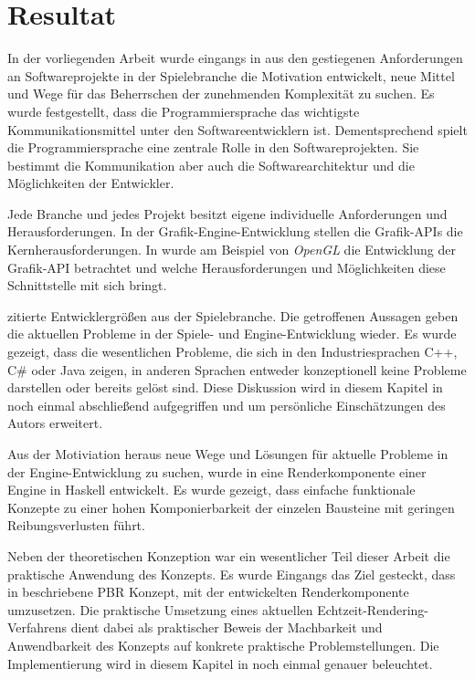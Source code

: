 \chapter{Resultat}
\label{chap:resultat}

In der vorliegenden Arbeit wurde eingangs in  aus den gestiegenen Anforderungen an Softwareprojekte in der Spielebranche die Motivation entwickelt, neue Mittel und Wege für das Beherrschen der zunehmenden Komplexität zu suchen. Es wurde festgestellt, dass die Programmiersprache das wichtigste Kommunikationsmittel unter den Softwareentwicklern ist. Dementsprechend spielt die Programmiersprache eine zentrale Rolle in den Softwareprojekten. Sie bestimmt die Kommunikation aber auch die Softwarearchitektur und die Möglichkeiten der Entwickler.

Jede Branche und jedes Projekt besitzt eigene individuelle Anforderungen und Herausforderungen. In der Grafik-Engine-Entwicklung stellen die Grafik-\ac{API}s die Kernherausforderungen. In  wurde am Beispiel von \textit{OpenGL} die Entwicklung der Grafik-\ac{API} betrachtet und welche Herausforderungen und Möglichkeiten diese Schnittstelle mit sich bringt.

 zitierte Entwicklergrößen aus der Spielebranche. Die getroffenen Aussagen geben die aktuellen Probleme in der Spiele- und Engine-Entwicklung wieder. Es wurde gezeigt, dass die wesentlichen Probleme, die sich in den Industriesprachen C++, C\# oder Java zeigen, in anderen Sprachen entweder konzeptionell keine Probleme darstellen oder bereits gelöst sind. Diese Diskussion wird in diesem Kapitel in  noch einmal abschließend aufgegriffen und um persönliche Einschätzungen des Autors erweitert.

Aus der Motiviation heraus neue Wege und Lösungen für aktuelle Probleme in der Engine-Entwicklung zu suchen, wurde in  eine Renderkomponente einer Engine in Haskell entwickelt. Es wurde gezeigt, dass einfache funktionale Konzepte zu einer hohen Komponierbarkeit der einzelen Bausteine mit geringen Reibungsverlusten führt.

Neben der theoretischen Konzeption war ein wesentlicher Teil dieser Arbeit die praktische Anwendung des Konzepts. Es wurde Eingangs das Ziel gesteckt, dass in  beschriebene \ac{PBR} Konzept, mit der entwickelten Renderkomponente umzusetzen. Die praktische Umsetzung eines aktuellen Echtzeit-Rendering-Verfahrens dient dabei als praktischer Beweis der Machbarkeit und Anwendbarkeit des Konzepts auf konkrete praktische Problemstellungen. Die Implementierung wird in diesem Kapitel in  noch einmal genauer beleuchtet.


